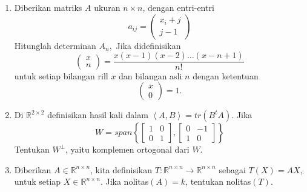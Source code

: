\documentclass[12pt,twoside]{article}
\begin{document}
\begin{enumerate}
	\item Diberikan matriks $A$ ukuran $n \times n$, dengan entri-entri
	      \begin{equation*}
		      a_{ij} = \left( \begin{array}{c}
				      x_i+j \\j-1
			      \end{array} \right)
	      \end{equation*}
	      Hitunglah determinan $A_n,$ Jika didefinisikan
	      \begin{equation*}
		      \left( \begin{array}{c}
				      x \\n
			      \end{array} \right) = \dfrac{x(x-1)(x-2)\dots(x-n+1)}{n!}
	      \end{equation*}
	      untuk setiap bilangan rill $x$ dan bilangan asli $n$ dengan ketentuan
	      \begin{equation*}
		      \left( \begin{array}{c}
			      x \\0
		      \end{array} \right) = 1.
	      \end{equation*}

	\item Di $\mathbb{R}^{2\times 2}$ definisikan hasil kali dalam $\left< A,B \right> = tr(B^tA)$. Jika
	      \begin{equation*}
		      W = span \left\lbrace \left[ \begin{array}{cc}
				      1 & 0 \\0&1
			      \end{array} \right], \left[ \begin{array}{cc}
				      0 & -1 \\1&0
			      \end{array} \right]  \right\rbrace
	      \end{equation*}
	      Tentukan $W^\bot$, yaitu komplemen ortogonal dari $W$.

	\item Diberikan $A \in \mathbb{R}^{n \times n}$, kita definisikan $T : \mathbb{R}^{n \times n} \to \mathbb{R}^{n \times n }$ sebagai $T(X) = AX$, untuk setiap $X \in \mathbb{R}^{n \times n}$. Jika nolitas$(A)=k$, tentukan nolitas$(T)$.
\end{enumerate}

\newpage
{}
\end{document}

